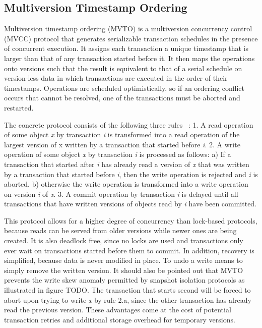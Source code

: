 \documentclass[10pt,final,journal]{IEEEtran}
\begin{document}
\subsection{Multiversion Timestamp Ordering}
Multiversion timestamp ordering (MVTO) is a multiversion concurrency control (MVCC) protocol that generates serializable transaction schedules in the presence of concurrent execution. It assigns each transaction a unique timestamp that is larger than that of any transaction started before it. It then maps the operations onto versions such that the result is equivalent to that of a serial schedule on version-less data in which transactions are executed in the order of their timestamps. Operations are scheduled optimistically, so if an ordering conflict occurs that cannot be resolved, one of the transactions must be aborted and restarted.

The concrete protocol consists of the following three rules ~\cite{Weikum:2001:TIS}:
1. A read operation of some object \emph{x} by transaction \emph{i} is transformed into a read operation of the largest version of x written by a transaction that started before \emph{i}.
2. A write operation of some object \emph{x} by transaction \emph{i} is processed as follows:
a) If a transaction that started after \emph{i} has already read a version of \emph{x} that was written by a transaction that started before \emph{i}, then the write operation is rejected and \emph{i} is aborted.
b) otherwise the write operation is transformed into a write operation on version \emph{i} of \emph{x}.
3. A commit operation by transaction \emph{i} is delayed until all transactions that have written versions of objects read by \emph{i} have been committed.

This protocol allows for a higher degree of concurrency than lock-based protocols, because reads can be served from older versions while newer ones are being created. It is also deadlock free, since no locks are used and transactions only ever wait on transactions started before them to commit. In addition, recovery is simplified, because data is never modified in place. To undo a write means to simply remove the written version. It should also be pointed out that MVTO prevents the write skew anomaly permitted by snapshot isolation protocols as illustrated in figure TODO. The transaction that starts second will be forced to abort upon trying to write \emph{x} by rule 2.a, since the other transaction has already read the previous version. These advantages come at the cost of potential transaction retries and additional storage overhead for temporary versions.
\end{document}
